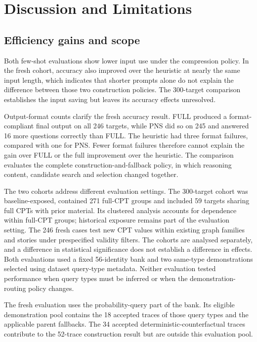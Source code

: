 \chapter{Discussion and Limitations}\label{ch:7}

\section{Efficiency gains and scope}\label{sec:7.1}

Both few-shot evaluations show lower input use under the compression policy. In the fresh cohort, accuracy also improved over the heuristic at nearly the same input length, which indicates that shorter prompts alone do not explain the difference between those two construction policies. The 300-target comparison establishes the input saving but leaves its accuracy effects unresolved.

Output-format counts clarify the fresh accuracy result. FULL produced a format-compliant final output on all 246 targets, while PNS did so on 245 and answered 16 more questions correctly than FULL. The heuristic had three format failures, compared with one for PNS. Fewer format failures therefore cannot explain the gain over FULL or the full improvement over the heuristic. The comparison evaluates the complete construction-and-fallback policy, in which reasoning content, candidate search and selection changed together.

The two cohorts address different evaluation settings. The 300-target cohort was baseline-exposed, contained 271 full-CPT groups and included 59 targets sharing full CPTs with prior material. Its clustered analysis accounts for dependence within full-CPT groups; historical exposure remains part of the evaluation setting. The 246 fresh cases test new CPT values within existing graph families and stories under prespecified validity filters. The cohorts are analysed separately, and a difference in statistical significance does not establish a difference in effects. Both evaluations used a fixed 56-identity bank and two same-type demonstrations selected using dataset query-type metadata. Neither evaluation tested performance when query types must be inferred or when the demonstration-routing policy changes.

The fresh evaluation uses the probability-query part of the bank. Its eligible demonstration pool contains the 18 accepted traces of those query types and the applicable parent fallbacks. The 34 accepted deterministic-counterfactual traces contribute to the 52-trace construction result but are outside this evaluation pool.

